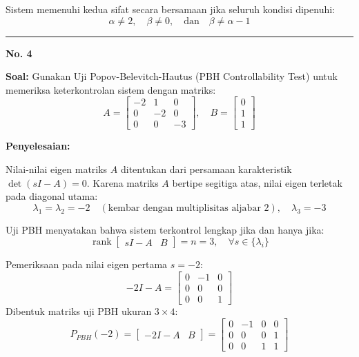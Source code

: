 \documentclass[11pt,a4paper]{article}
\begin{document}
Sistem memenuhi kedua sifat secara bersamaan jika seluruh kondisi dipenuhi:
$$\alpha \ne 2, \quad \beta \ne 0, \quad \text{dan} \quad \beta \ne \alpha - 1$$

\vspace{12pt}
\hrule
\vspace{10pt}

\textbf{\large No. 4}

\textbf{Soal:}  
Gunakan Uji Popov-Belevitch-Hautus (PBH Controllability Test) untuk memeriksa keterkontrolan sistem dengan matriks:
$$A = \begin{bmatrix} -2 & 1 & 0 \\ 0 & -2 & 0 \\ 0 & 0 & -3 \end{bmatrix}, \quad B = \begin{bmatrix} 0 \\ 1 \\ 1 \end{bmatrix}$$

\textbf{Penyelesaian:}

Nilai-nilai eigen matriks $A$ ditentukan dari persamaan karakteristik $\det(sI - A) = 0$. Karena matriks $A$ bertipe segitiga atas, nilai eigen terletak pada diagonal utama:
$$\lambda_1 = \lambda_2 = -2 \quad (\text{kembar dengan multiplisitas aljabar } 2), \quad \lambda_3 = -3$$

Uji PBH menyatakan bahwa sistem terkontrol lengkap jika dan hanya jika:
$$\operatorname{rank} \begin{bmatrix} sI - A & B \end{bmatrix} = n = 3, \quad \forall s \in \{\lambda_i\}$$

Pemeriksaan pada nilai eigen pertama $s = -2$:
$$-2 I - A = \begin{bmatrix} 0 & -1 & 0 \\ 0 & 0 & 0 \\ 0 & 0 & 1 \end{bmatrix}$$
Dibentuk matriks uji PBH ukuran $3 \times 4$:
$$P_{PBH}(-2) = \begin{bmatrix} -2I - A & B \end{bmatrix} = \begin{bmatrix} 0 & -1 & 0 & 0 \\ 0 & 0 & 0 & 1 \\ 0 & 0 & 1 & 1 \end{bmatrix}$$
\end{document}

